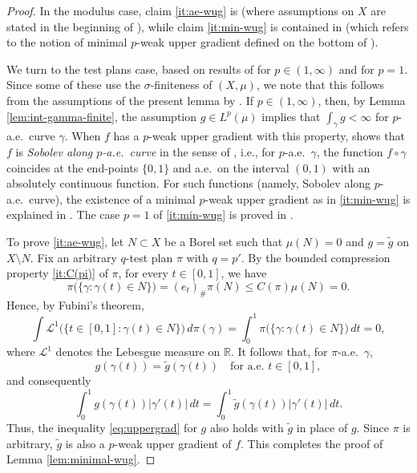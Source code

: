 \documentclass[11pt]{amsart}
\theoremstyle{definition}
\theoremstyle{remark}
\numberwithin{equation}{section}
\begin{document}
\begin{proof}
In the modulus case, claim \eqref{it:ae-wug}
is \cite[Lemma 6.2.8]{HKST:book}
(where assumptions on $X$ are stated in the beginning of \cite[Section 6.2]{HKST:book}),
while claim \eqref{it:min-wug} is contained in \cite[Theorem 6.3.20 and Remark
6.3.21]{HKST:book}
(which refers to the notion of minimal $p$-weak upper gradient defined on the bottom of
\cite[page 161]{HKST:book}).

We turn to the test plans case, based on results of
\cite{AGS:13} for $p\in(1,\infty)$ and \cite{CKR:24} for $p=1$. Since some of these use the
$\sigma$-finiteness of $(X,\mu)$,
we note that this follows from the assumptions of the
present lemma by \cite[Lemma 3.3.28]{HKST:book}.
If $p\in(1,\infty)$, then, by Lemma \ref{lem:int-gamma-finite}, the assumption $g\in
L^p(\mu)$ implies that
$\int_{\gamma}g<\infty$ for $p$-a.e.\ curve $\gamma$. When $f$ has a $p$-weak upper gradient
with this property, \cite[Remark 4.10]{AGS:13} shows that $f$ is {\em Sobolev along
$p$-a.e.\ curve}
in the sense of \cite[Definition 4.9]{AGS:13}, i.e., for $p$-a.e.\ $\gamma$, the function
$f\circ\gamma$ coincides at the end-points $\{0,1\}$ and a.e.\ on the interval $(0,1)$ with
an absolutely continuous function. For such functions (namely, Sobolev along $p$-a.e.\
curve),
the existence of a minimal $p$-weak upper gradient as in
\eqref{it:min-wug} is explained in
\cite[Definition 4.11 et seq.]{AGS:13}. The case $p=1$ of
\eqref{it:min-wug} is
proved in \cite[page 141]{CKR:24}.

To prove \eqref{it:ae-wug}, let $N\subset X$ be a Borel set such that
$\mu(N)=0$ and $g=\widetilde g$ on $X\setminus N$. Fix an arbitrary
$q$-test plan $\pi$ with $q=p'$. By the bounded compression property \eqref{it:C(pi)} of
$\pi$,
for every $t\in[0,1]$, we have
$$
 \pi\bigl(\{\gamma:\gamma(t)\in N\}\bigr)
 =(e_t)_\#\pi(N)
 \leq C(\pi)\mu(N)=0.
$$
Hence, by Fubini's theorem,
$$
 \int \mathcal L^1\bigl(\{t\in[0,1]:\gamma(t)\in N\}\bigr)
 \,d\pi(\gamma)
 =
 \int_0^1\pi\bigl(\{\gamma:\gamma(t)\in N\}\bigr)\,dt=0,
$$
where $\mathcal{L}^1$ denotes the Lebesgue measure on $\mathbb R$.
It follows that, for $\pi$-a.e.\ $\gamma$,
$$
 g(\gamma(t))=\widetilde g(\gamma(t))
 \quad\text{for a.e. }t\in[0,1],
$$
and consequently
$$
 \int_0^1 g(\gamma(t))|\gamma'(t)|\,dt
 =
 \int_0^1 \widetilde g(\gamma(t))|\gamma'(t)|\,dt.
$$
Thus, the inequality \eqref{eq:uppergrad} for $g$ also holds with
$\widetilde g$ in place of $g$. Since $\pi$ is arbitrary,
$\widetilde g$ is also a $p$-weak upper gradient of $f$.
This completes the proof of Lemma \ref{lem:minimal-wug}.
\end{proof}
\end{document}
